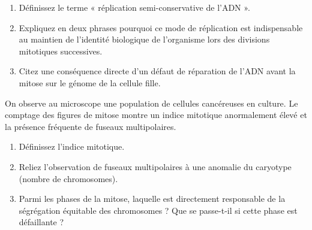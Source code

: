 \documentclass[11pt]{article}
\begin{document}
\begin{exercice}
\begin{enumerate}
    \item Définissez le terme « réplication semi-conservative de l'ADN ».
    \item Expliquez en deux phrases pourquoi ce mode de réplication est indispensable au maintien de l'identité biologique de l'organisme lors des divisions mitotiques successives.
    \item Citez une conséquence directe d'un défaut de réparation de l'ADN avant la mitose sur le génome de la cellule fille.
\end{enumerate}
\end{exercice}

\begin{exercice}
On observe au microscope une population de cellules cancéreuses en culture. Le comptage des figures de mitose montre un indice mitotique anormalement élevé et la présence fréquente de fuseaux multipolaires.
\begin{enumerate}
    \item Définissez l'indice mitotique.
    \item Reliez l'observation de fuseaux multipolaires à une anomalie du caryotype (nombre de chromosomes).
    \item Parmi les phases de la mitose, laquelle est directement responsable de la ségrégation équitable des chromosomes ? Que se passe-t-il si cette phase est défaillante ?
\end{enumerate}
\end{exercice}
\end{document}
